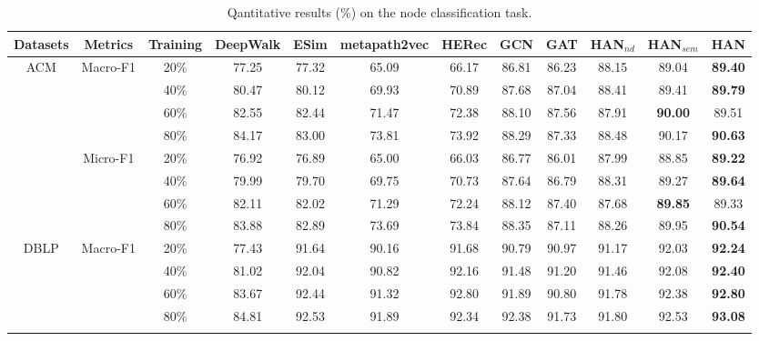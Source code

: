 \begin{table*}[]
	\centering
	\caption{Qantitative results (\%) on the node classification task.}\label{table_fenlei}
\begin{tabular}
{|c|c|c||c|c|c|c|c|c||c|c|c|}


		\hline
		Datasets                  & Metrics                   & Training & {DeepWalk}    & ESim  & {metapath2vec} & HERec & GCN   & {GAT}   & HAN$_{nd}$ & {HAN$_{sem}$}    & HAN           \\ \hline
		\multirow{8}{*}{ACM}  & \multirow{4}{*}{Macro-F1} & 20\%  & 77.25 & 77.32 & 65.09  & 66.17 & 86.81 & 86.23 & 88.15       & 89.04          & \textbf{89.40} \\
		&                           & 40\%  & 80.47 & 80.12 & 69.93  & 70.89 & 87.68 & 87.04 & 88.41       & 89.41          & \textbf{89.79} \\
		&                           & 60\%  & 82.55 & 82.44 & 71.47  & 72.38 & 88.10 & 87.56 & 87.91       & \textbf{90.00} & 89.51          \\
		&                           & 80\%  & 84.17 & 83.00 & 73.81  & 73.92 & 88.29 & 87.33 & 88.48       & 90.17          & \textbf{90.63} \\ \cline{2-12} 
		& \multirow{4}{*}{Micro-F1} & 20\%  & 76.92 & 76.89 & 65.00  & 66.03 & 86.77 & 86.01 & 87.99       & 88.85          & \textbf{89.22} \\
		&                           & 40\%  & 79.99 & 79.70 & 69.75  & 70.73 & 87.64 & 86.79 & 88.31       & 89.27          & \textbf{89.64} \\
		&                           & 60\%  & 82.11 & 82.02 & 71.29  & 72.24 & 88.12 & 87.40 & 87.68       & \textbf{89.85} & 89.33          \\
		&                           & 80\%  & 83.88 & 82.89 & 73.69  & 73.84 & 88.35 & 87.11 & 88.26       & 89.95          & \textbf{90.54} \\ \hline
		\multirow{8}{*}{DBLP} & \multirow{4}{*}{Macro-F1} & 20\%  & 77.43 & 91.64 & 90.16  & 91.68 & 90.79 & 90.97 & 91.17       & 92.03          & \textbf{92.24} \\
		&                           & 40\%  & 81.02 & 92.04 & 90.82  & 92.16 & 91.48 & 91.20 & 91.46       & 92.08          & \textbf{92.40} \\
		&                           & 60\%  & 83.67 & 92.44 & 91.32  & 92.80 & 91.89 & 90.80 & 91.78       & 92.38          & \textbf{92.80} \\
		&                           & 80\%  & 84.81 & 92.53 & 91.89  & 92.34 & 92.38 & 91.73 & 91.80       & 92.53          & \textbf{93.08} \\ \cline{2-12} 

\end{tabular}
\end{table*}
